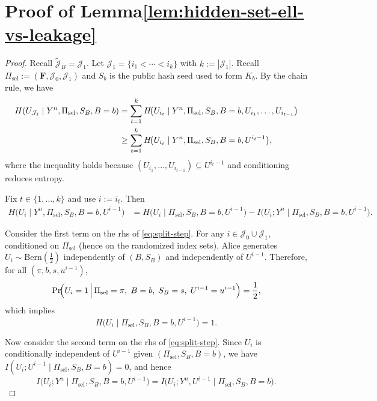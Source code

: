 \documentclass[onecolumn]{IEEEtran} %
\newcommand{\1}{\mathbbm{1}}
\theoremstyle{boldremark}
\begin{document}
\section{Proof of Lemma\ref{lem:hidden-set-ell-vs-leakage}}\label{APP_proof_hidden-set-ell-vs-leakage}
\begin{proof}
Recall $\tilde{\mathcal{J}}_{\bar{B}}=\mathcal J_1$. Let $\mathcal J_1=\{i_1<\cdots<i_k\}$ with $k:=|\mathcal J_1|$.
Recall $\Pi_{\mathrm{sel}}:=(\mathbf F,\mathcal J_0,\mathcal J_1)$ and $S_b$ is the public hash seed used to form $K_b$.
By the chain rule, we have
\begin{align}
H(U_{\mathcal J_1}\mid Y^n,\Pi_{\mathrm{sel}},S_B,B=b)
&=\sum_{t=1}^k
H\!\bigl(U_{i_t}\mid Y^n,\Pi_{\mathrm{sel}},S_B,B=b,U_{i_1},\dots,U_{i_{t-1}}\bigr)\notag\\
&\ge
\sum_{t=1}^k
H\!\bigl(U_{i_t}\mid Y^n,\Pi_{\mathrm{sel}},S_B,B=b,U^{i_t-1}\bigr),
\label{eq:cond-reduce-step-hidden}
\end{align}
where the inequality holds because $(U_{i_1},\dots,U_{i_{t-1}})\subseteq U^{i_t-1}$ and conditioning reduces entropy.

Fix $t\in\{1,\dots,k\}$ and use $i:=i_t$. Then
\begin{align}
H\!\bigl(U_i\mid Y^n,\Pi_{\mathrm{sel}},S_B,B=b,U^{i-1}\bigr)
&=
H\!\bigl(U_i\mid \Pi_{\mathrm{sel}},S_B,B=b,U^{i-1}\bigr)
-
I\!\bigl(U_i;Y^n\mid \Pi_{\mathrm{sel}},S_B,B=b,U^{i-1}\bigr).
\label{eq:split-step}
\end{align}

Consider the first term on the \gls{rhs} of \eqref{eq:split-step}. For any $i\in \mathcal J_0\cup \mathcal J_1$, conditioned on $\Pi_{\mathrm{sel}}$ (hence on the randomized index sets),
Alice generates $U_i\sim \mathrm{Bern}(\tfrac12)$ independently of $(B,S_B)$ and independently of $U^{i-1}$.
Therefore, for all $(\pi,b,s,u^{i-1})$,
\[
\Pr\!\Bigl(U_i=1 \,\Big|\, \Pi_{\mathrm{sel}}=\pi,\; B=b,\; S_B=s,\; U^{i-1}=u^{i-1}\Bigr)=\frac12,
\]
which implies
\begin{equation}\label{eq:first-term-1}
H\!\bigl(U_i \mid \Pi_{\mathrm{sel}},S_B,B=b,U^{i-1}\bigr)=1 .
\end{equation}

Now consider the second term on the \gls{rhs} of \eqref{eq:split-step}.
Since $U_i$ is conditionally independent of $U^{i-1}$ given $(\Pi_{\mathrm{sel}},S_B,B=b)$, we have
$I(U_i;U^{i-1}\mid \Pi_{\mathrm{sel}},S_B,B=b)=0$, and hence
\begin{equation}\label{eq:add-U-prev}
I\!\bigl(U_i;Y^n\mid \Pi_{\mathrm{sel}},S_B,B=b,U^{i-1}\bigr)
=
I\!\bigl(U_i;Y^n,U^{i-1}\mid \Pi_{\mathrm{sel}},S_B,B=b\bigr).
\end{equation}


\end{proof}
\end{document}
